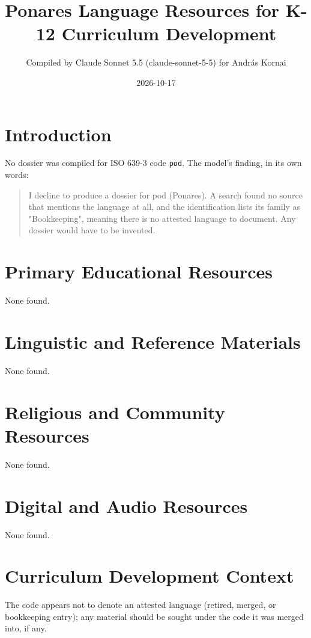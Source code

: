 \documentclass[12pt]{article}
\title{Ponares Language Resources for K-12 Curriculum Development}
\author{Compiled by Claude Sonnet 5.5 (claude-sonnet-5-5) for Andr\'as Kornai}
\date{2026-10-17}
\begin{document}
\maketitle

\section{Introduction}
No dossier was compiled for ISO 639-3 code \texttt{pod}. The model's finding, in its own words:

\begin{quote}
I decline to produce a dossier for pod (Ponares). A search found no source that mentions the language at all, and the identification lists its family as "Bookkeeping", meaning there is no attested language to document. Any dossier would have to be invented.
\end{quote}

\section{Primary Educational Resources}
None found.
\section{Linguistic and Reference Materials}
None found.
\section{Religious and Community Resources}
None found.
\section{Digital and Audio Resources}
None found.
\section{Curriculum Development Context}
The code appears not to denote an attested language (retired, merged, or bookkeeping entry); any material should be sought under the code it was merged into, if any.
\end{document}
